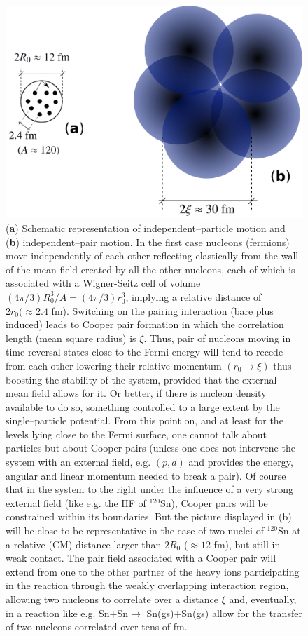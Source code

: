\begin{figure}
\centerline{\includegraphics*[width=14cm,angle=0]{nutshell/figs/fig3_1_4.pdf}}
\caption{(\textbf{a}) Schematic representation of independent--particle motion and (\textbf{b}) independent--pair motion. In the first case nucleons (fermions) move independently of each other reflecting elastically from the wall of the mean field created by all the other nucleons, each of which is associated with a Wigner-Seitz cell of volume $(4\pi/3)R_0^3/A=(4\pi/3)r_0^3$, implying a relative distance of $2r_0(\approx 2.4$ fm). Switching on the pairing interaction (bare plus induced) leads to Cooper pair formation in which the correlation length (mean square radius) is $\xi$. Thus, pair of nucleons moving in time reversal states close to the Fermi energy will tend to recede from each other lowering their relative momentum $(r_0\rightarrow \xi)$ thus boosting the stability of the system, provided that the external mean field allows for it. Or better, if  there is nucleon density available to do so, something controlled to a large extent by the single--particle potential. From this point on, and at least for the levels lying close to the Fermi surface, one cannot talk about particles but about Cooper pairs (unless one does not intervene the system with an external field, e.g. $(p,d)$ and provides the energy, angular and linear momentum needed to break a pair). Of course that in the system to the right under the influence of a very strong external field (like e.g. the HF of $^{120}$Sn), Cooper pairs will be constrained within its boundaries. But the picture displayed in (b) will be close to be representative  in the case of two nuclei of $^{120}$Sn at a relative (CM) distance larger than $2R_0$ ($\approx 12$ fm), but still in weak contact. The pair field associated with a Cooper pair will extend from one to the other partner of the heavy ions participating in the reaction through the weakly overlapping interaction region, allowing two nucleons to correlate over a distance $\xi$ and, eventually, in a reaction like e.g. Sn+Sn$\rightarrow$ Sn(gs)+Sn(gs) allow for the transfer of two nucleons correlated over tens of fm.}\label{fig3.2.1}
\end{figure}
